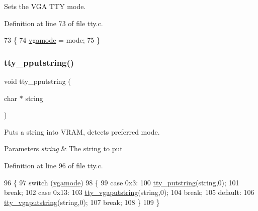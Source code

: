 Sets the V\+GA T\+TY mode. 



Definition at line 73 of file tty.\+c.


\begin{DoxyCode}
73                                 \{
74     \hyperlink{a00167_af93b0649fdd1bea5b6d29ed37205aa2c_af93b0649fdd1bea5b6d29ed37205aa2c}{vgamode} = mode;
75 \}
\end{DoxyCode}
\mbox{\label{a00170_ade960b1320324706aac6c00cc6b1b2fe_ade960b1320324706aac6c00cc6b1b2fe}} 
\subsubsection{\texorpdfstring{tty\+\_\+pputstring()}{tty\_pputstring()}}
{\footnotesize\ttfamily void tty\+\_\+pputstring (\begin{DoxyParamCaption}\item[{char $\ast$}]{string }\end{DoxyParamCaption})}



Puts a string into V\+R\+AM, detects preferred mode. 


\begin{DoxyParams}{Parameters}
{\em string} & The string to put \\
\hline
\end{DoxyParams}


Definition at line 96 of file tty.\+c.


\begin{DoxyCode}
96                                   \{
97     \textcolor{keywordflow}{switch} (\hyperlink{a00167_af93b0649fdd1bea5b6d29ed37205aa2c_af93b0649fdd1bea5b6d29ed37205aa2c}{vgamode})
98     \{
99     \textcolor{keywordflow}{case} 0x3:
100         \hyperlink{a00167_a5b5bf610a57f3c59b2851fa2652081ec_a5b5bf610a57f3c59b2851fa2652081ec}{tty\_putstring}(\textcolor{keywordtype}{string},0);
101         \textcolor{keywordflow}{break};
102     \textcolor{keywordflow}{case} 0x13:
103         \hyperlink{a00167_a05ca3f5e64f38fec173b635ca8465415_a05ca3f5e64f38fec173b635ca8465415}{tty\_vgaputstring}(\textcolor{keywordtype}{string},0);
104         \textcolor{keywordflow}{break};
105     \textcolor{keywordflow}{default}:
106         \hyperlink{a00167_a05ca3f5e64f38fec173b635ca8465415_a05ca3f5e64f38fec173b635ca8465415}{tty\_vgaputstring}(\textcolor{keywordtype}{string},0);
107         \textcolor{keywordflow}{break};
108     \}
109 \}
\end{DoxyCode}
\mbox{\label{a00170_abaf93f9e56ddb7b10462070f59e534e4_abaf93f9e56ddb7b10462070f59e534e4}} 
